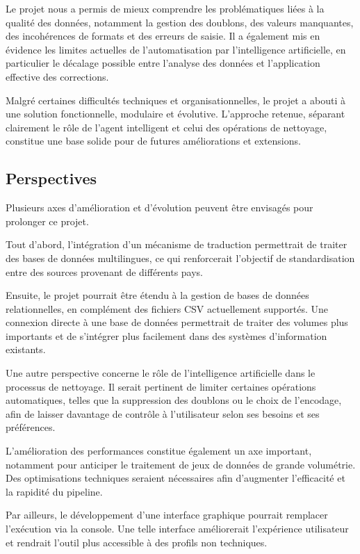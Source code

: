 \documentclass[a4paper, 12pt, twoside]{article}
\begin{document}
Le projet nous a permis de mieux comprendre les problématiques liées à la qualité des données, notamment la gestion des doublons, des valeurs manquantes, des incohérences de formats et des erreurs de saisie. Il a également mis en évidence les limites actuelles de l’automatisation par l’intelligence artificielle, en particulier le décalage possible entre l’analyse des données et l’application effective des corrections.

Malgré certaines difficultés techniques et organisationnelles, le projet a abouti à une solution fonctionnelle, modulaire et évolutive. L’approche retenue, séparant clairement le rôle de l’agent intelligent et celui des opérations de nettoyage, constitue une base solide pour de futures améliorations et extensions.

	\subsection{Perspectives}
Plusieurs axes d’amélioration et d’évolution peuvent être envisagés pour prolonger ce projet.

Tout d’abord, l’intégration d’un mécanisme de traduction permettrait de traiter des bases de données multilingues, ce qui renforcerait l’objectif de standardisation entre des sources provenant de différents pays.

Ensuite, le projet pourrait être étendu à la gestion de bases de données relationnelles, en complément des fichiers CSV actuellement supportés. Une connexion directe à une base de données permettrait de traiter des volumes plus importants et de s’intégrer plus facilement dans des systèmes d’information existants.

Une autre perspective concerne le rôle de l’intelligence artificielle dans le processus de nettoyage. Il serait pertinent de limiter certaines opérations automatiques, telles que la suppression des doublons ou le choix de l’encodage, afin de laisser davantage de contrôle à l’utilisateur selon ses besoins et ses préférences.

L’amélioration des performances constitue également un axe important, notamment pour anticiper le traitement de jeux de données de grande volumétrie. Des optimisations techniques seraient nécessaires afin d’augmenter l’efficacité et la rapidité du pipeline.

Par ailleurs, le développement d’une interface graphique pourrait remplacer l’exécution via la console. Une telle interface améliorerait l’expérience utilisateur et rendrait l’outil plus accessible à des profils non techniques.
\end{document}
